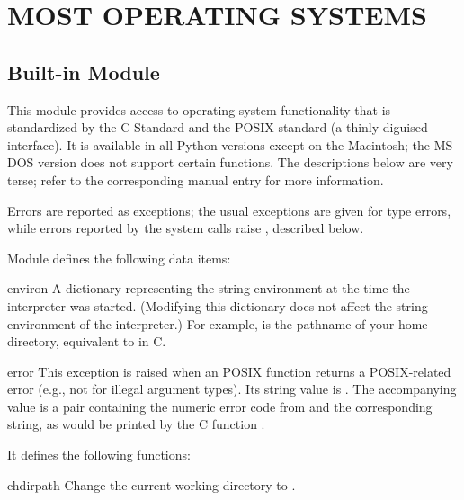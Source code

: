 \chapter{MOST OPERATING SYSTEMS}

\section{Built-in Module }


This module provides access to operating system functionality that is
standardized by the C Standard and the POSIX standard (a thinly diguised
\UNIX{} interface).
It is available in all Python versions except on the Macintosh;
the MS-DOS version does not support certain functions.
The descriptions below are very terse; refer to the
corresponding \UNIX{} manual entry for more information.

Errors are reported as exceptions; the usual exceptions are given
for type errors, while errors reported by the system calls raise
, described below.

Module  defines the following data items:

\renewcommand{\indexsubitem}{(data in module posix)}
\begin{datadesc}{environ}
A dictionary representing the string environment at the time
the interpreter was started.
(Modifying this dictionary does not affect the string environment of the
interpreter.)
For example,
is the pathname of your home directory, equivalent to
in C.
\end{datadesc}

\renewcommand{\indexsubitem}{(exception in module posix)}
\begin{excdesc}{error}
This exception is raised when an POSIX function returns a
POSIX-related error (e.g., not for illegal argument types).  Its
string value is .  The accompanying value is a
pair containing the numeric error code from  and the
corresponding string, as would be printed by the C function
.
\end{excdesc}

It defines the following functions:

\renewcommand{\indexsubitem}{(in module posix)}
\begin{funcdesc}{chdir}{path}
Change the current working directory to .
\end{funcdesc}

